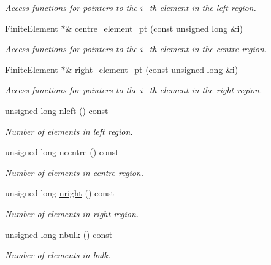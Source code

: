 \begin{DoxyCompactItemize}
\begin{DoxyCompactList}\small\item\em Access functions for pointers to the $ i $ -\/th element in the left region. \end{DoxyCompactList}\item 
Finite\+Element $\ast$\& \hyperlink{classoomph_1_1ChannelSpineMesh_a127dc05f48ad6af69f26dd1504eaeba5}{centre\+\_\+element\+\_\+pt} (const unsigned long \&i)
\begin{DoxyCompactList}\small\item\em Access functions for pointers to the $ i $ -\/th element in the centre region. \end{DoxyCompactList}\item 
Finite\+Element $\ast$\& \hyperlink{classoomph_1_1ChannelSpineMesh_a599b1d10bc47ceb9903a01b12036f400}{right\+\_\+element\+\_\+pt} (const unsigned long \&i)
\begin{DoxyCompactList}\small\item\em Access functions for pointers to the $ i $ -\/th element in the right region. \end{DoxyCompactList}\item 
unsigned long \hyperlink{classoomph_1_1ChannelSpineMesh_a6f7b8f540855876e49b5f1c3f0214d9a}{nleft} () const
\begin{DoxyCompactList}\small\item\em Number of elements in left region. \end{DoxyCompactList}\item 
unsigned long \hyperlink{classoomph_1_1ChannelSpineMesh_a422ed0d224b8da3c35732328e1aacdc0}{ncentre} () const
\begin{DoxyCompactList}\small\item\em Number of elements in centre region. \end{DoxyCompactList}\item 
unsigned long \hyperlink{classoomph_1_1ChannelSpineMesh_a559352375de869e889191d0e6c133031}{nright} () const
\begin{DoxyCompactList}\small\item\em Number of elements in right region. \end{DoxyCompactList}\item 
unsigned long \hyperlink{classoomph_1_1ChannelSpineMesh_a89f5523009288ce87d2f0d1cbb9fb488}{nbulk} () const
\begin{DoxyCompactList}\small\item\em Number of elements in bulk. \end{DoxyCompactList}\item 

\end{DoxyCompactItemize}
